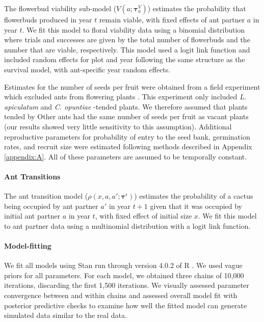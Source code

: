 \documentclass[11pt]{article}
\begin{document}
The flowerbud viability sub-model ($V(a;\pmb{\tau}^{V}_{a})$) estimates the probability that flowerbuds produced in year $t$ remain viable, with fixed effects of ant partner $a$ in year $t$.
We fit this model to floral viability data using a binomial distribution where trials and successes are given by the total number of flowerbuds and the number that are viable, respectively.
This model used a logit link function and included random effects for plot and year following the same structure as the survival model, with ant-specific year random effects. 

Estimates for the number of seeds per fruit were obtained from a field experiment which excluded ants from flowering plants \citep{Ohm2014}.
This experiment only included \textit{L. apiculatum} and \textit{C. opuntiae} -tended plants.
We therefore assumed that plants tended by Other ants had the same number of seeds per fruit as vacant plants (our results showed very little sensitivity to this assumption). 
Additional reproductive parameters for probability of entry to the seed bank, germination rates, and recruit size were estimated following methods described in Appendix \ref{appendix:A}. 
All of these parameters are assumed to be temporally constant.
	
\paragraph{Ant Transitions}
The ant transition model ($\rho(x,a,a';\pmb{\tau}^{\epsilon})$) estimates the probability of a cactus being occupied by ant partner $a'$ in year $t+1$ given that it was occupied by initial ant partner $a$ in year $t$, with fixed effect of initial size $x$.
We fit this model to ant partner data using a multinomial distribution with a logit link function. 

\paragraph{Model-fitting}
We fit all models using Stan run through version 4.0.2 of R \citep{Rcite,Rstancite}. 
We used vague priors for all parameters. 
For each model, we obtained three chains of 10,000 iterations, discarding the first 1,500 iterations. 
We visually assessed parameter convergence between and within chains and assessed overall model fit with posterior predictive checks to examine how well the fitted model can generate simulated data similar to the real data.
\end{document}
